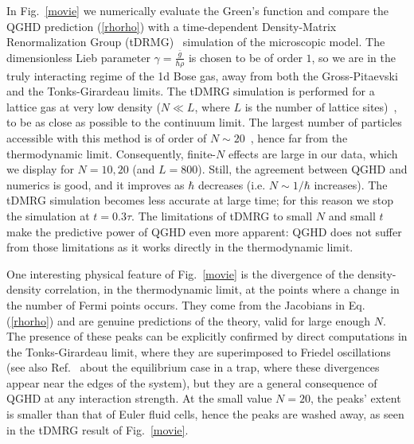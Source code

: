 \documentclass[twocolumn,amsfonts,showpacs,superscriptaddress]{revtex4-1}
\begin{document}
In Fig.~\ref{movie} we numerically evaluate the Green's function and compare the QGHD prediction (\ref{rhorho}) with a time-dependent Density-Matrix Renormalization Group (tDRMG)~\cite{dmrg-rev, itensor} simulation of the microscopic model. The dimensionless Lieb parameter $\gamma = \frac{\bar{g}}{\hbar \rho}$ is chosen to be of order $1$, so we are in the truly interacting regime of the 1d Bose gas, away from both the 
Gross-Pitaevski and the Tonks-Girardeau limits. 
The tDMRG simulation is performed for a lattice gas at very low density ($N \ll L$, where $L$ is the number of lattice sites)~\cite{schmidt2007exact,peotta2014quantum}, to be as close as possible to the continuum limit.
The largest number of particles accessible with this method is of order of $N \sim 20$~\cite{peotta2014quantum}, hence far from the thermodynamic limit. Consequently, finite-$N$ effects are large in our data, which we display for $N = 10, 20$ (and $L =800$). Still, the agreement between QGHD and numerics is good, and it improves as $\hbar$ decreases (i.e. $N\sim 1/\hbar$ increases). The tDMRG simulation becomes less accurate at large time; for this reason we stop the simulation at $t= 0.3 \tau$.
The limitations of tDMRG to small $N$ and small $t$ make the predictive power of QGHD even more apparent: QGHD does not suffer from those limitations as it works directly in the thermodynamic limit.

One interesting physical feature of Fig.~\ref{movie} is the divergence of the density-density correlation, in the thermodynamic limit, at the points where a change in the number of Fermi points occurs. They come from the Jacobians in Eq. (\ref{rhorho}) and are genuine predictions of the theory, valid for large enough $N$. The presence of these peaks can be explicitly confirmed by direct computations in the Tonks-Girardeau limit, where they are superimposed to Friedel oscillations~\cite{inpreparation} (see also Ref.~\cite{brun2018inhomogeneous} about the equilibrium case in a trap, where these divergences appear near the edges of the system), but they are a general consequence of QGHD at any interaction strength. At the small value $N=20$, the peaks' extent is smaller than that of Euler fluid cells, hence the peaks are washed away, as seen in the tDMRG result of Fig.~\ref{movie}.

\end{document}
